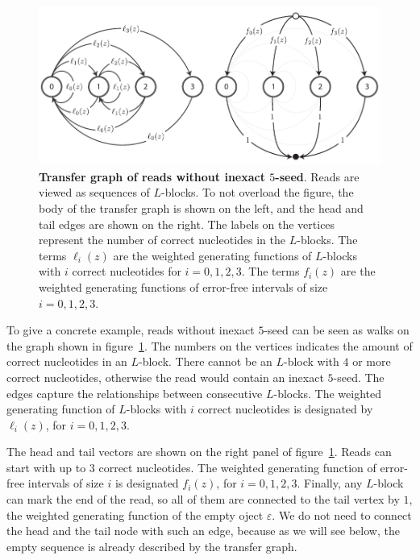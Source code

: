 \documentclass{article}
\begin{document}
\begin{figure}[h]
\centering
\includegraphics[scale=.79]{inexact_graph.pdf}
\caption{\textbf{Transfer graph of reads without inexact $5$-seed}. Reads
are viewed as sequences of $L$-blocks. To not overload the figure, the
body of the transfer graph is shown on the left, and the head and tail
edges are shown on the right. The labels on the vertices represent the
number of correct nucleotides in the $L$-blocks. The terms $\ell_i(z)$ are
the weighted generating functions of $L$-blocks with $i$ correct
nucleotides for $i = 0,1,2,3$. The terms $f_i(z)$ are the weighted
generating functions of error-free intervals of size $i = 0,1,2,3$.}
\label{fig:inexact_graph}
\end{figure}

To give a concrete example, reads without inexact $5$-seed can be seen as
walks on the graph shown in figure~\ref{fig:inexact_graph}. The numbers on
the vertices indicates the amount of correct nucleotides in an $L$-block.
There cannot be an $L$-block with $4$ or more correct nucleotides,
otherwise the read would contain an inexact $5$-seed. The edges capture
the relationships between consecutive $L$-blocks. The weighted generating
function of $L$-blocks with $i$ correct nucleotides is designated by
$\ell_i(z)$, for $i = 0, 1, 2, 3$.

The head and tail vectors are shown on the right panel of
figure~\ref{fig:inexact_graph}. Reads can start with up to $3$ correct
nucleotides. The weighted generating function of error-free intervals of
size $i$ is designated $f_i(z)$, for $i = 0, 1, 2, 3$. Finally, any
$L$-block can mark the end of the read, so all of them are connected to
the tail vertex by $1$, the weighted generating function of the empty
oject $\varepsilon$. We do not need to connect the head and the tail node
with such an edge, because as we will see below, the empty sequence is
already described by the transfer graph.
\end{document}
